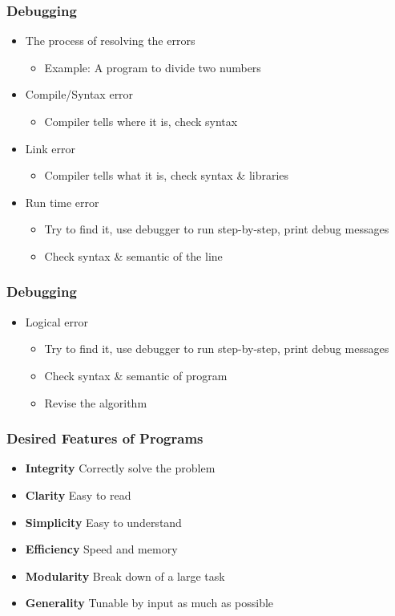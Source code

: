 \documentclass{../c-lecture}
\begin{document}
\begin{frame}
  \frametitle{Debugging}
  \begin{itemize}
    \item The process of resolving the errors
    \begin{itemize}
      \item Example: A program to divide two numbers
    \end{itemize}

    \item Compile/Syntax error
    \begin{itemize}
      \item Compiler tells where it is, check syntax
    \end{itemize}

    \item Link error
    \begin{itemize}
      \item Compiler tells what it is, check syntax \& libraries
    \end{itemize}

    \item Run time error
    \begin{itemize}
      \item
        Try to find it, use debugger to run step-by-step, print debug messages
      \item Check syntax \& semantic of the line
    \end{itemize}
  \end{itemize}
\end{frame}

\begin{frame}
  \frametitle{Debugging}
  \begin{itemize}
    \item Logical error
      \begin{itemize}
        \item
          Try to find it, use debugger to run step-by-step, print debug messages
        \item Check syntax \& semantic of program
        \item Revise the algorithm
      \end{itemize}
  \end{itemize}
\end{frame}

\begin{frame}
  \frametitle{Desired Features of Programs}
  \begin{itemize}
    \item \textbf{Integrity}
    Correctly solve the problem
    \item \textbf{Clarity}
    Easy to read
    \item \textbf{Simplicity}
    Easy to understand
    \item \textbf{Efficiency}
    Speed and memory
    \item \textbf{Modularity}
    Break down of a large task
    \item \textbf{Generality}
    Tunable by input as much as possible
  \end{itemize}
\end{frame}
\end{document}
